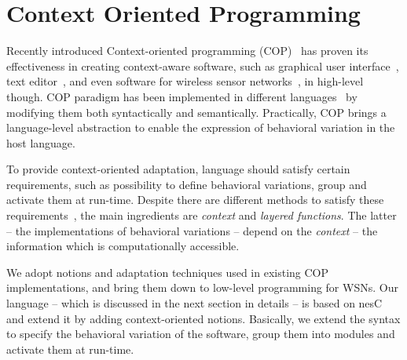 \section{Context Oriented Programming}\label{sec:cop}

Recently introduced Context-oriented programming (COP)~\cite{Hirschfeld08} has
proven its effectiveness in creating context-aware software, such as graphical
user interface~\cite{Keays03}, text editor~\cite{Kamina11}, and even software for wireless
sensor networks~\cite{Sehic11}, in high-level though. COP paradigm has been
implemented in different languages~\cite{Salvaneschi12} by modifying them both
syntactically and semantically. Practically, COP brings a language-level abstraction 
to enable the expression of behavioral variation in the host language.

To provide context-oriented adaptation, language should satisfy certain requirements, such as
possibility to define behavioral variations, group and activate them at
run-time. Despite there are different methods to satisfy these
requirements~\cite{Salvaneschi12}, the main ingredients are \emph{context} and
\emph{layered functions}. The latter -- the implementations of behavioral
variations -- depend on the \emph{context} -- the information which is
computationally accessible.

We adopt notions and adaptation techniques used in existing COP implementations,
and bring them down to low-level programming for WSNs. Our language \conesc --
which is discussed in the next section in details -- is based on nesC and extend
it by adding context-oriented notions. Basically, we extend the syntax to
specify the behavioral variation of the software, group them into modules and
activate them at run-time.
